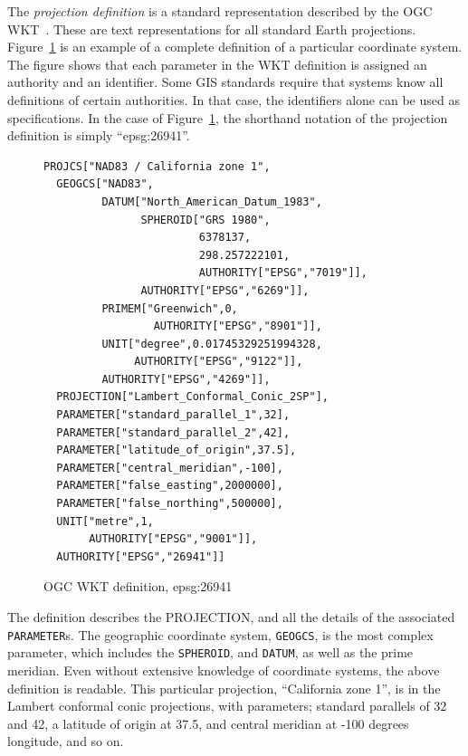 \documentclass{ucdthesis}       %
\begin{document}
The \emph{projection definition} is a standard representation
described by the \ac{OGC} \acf{WKT}~\cite{whites01defin-data}.  These
are text representations for all standard Earth projections.
Figure~\ref{fig:wkt} is an example of a complete definition of a
particular coordinate system.  The figure shows that each parameter in
the \ac{WKT} definition is assigned an authority and an identifier.
Some \ac{GIS} standards require that systems know all definitions of
certain authorities.  In that case, the identifiers alone can be used
as specifications.  In the case of Figure~\ref{fig:wkt}, the shorthand
notation of the projection definition is simply ``epsg:26941''.

\begin{figure}[htb]
  \centering
\begin{verbatim}
PROJCS["NAD83 / California zone 1",
  GEOGCS["NAD83",
         DATUM["North_American_Datum_1983",
               SPHEROID["GRS 1980",
                        6378137,
                        298.257222101,
                        AUTHORITY["EPSG","7019"]],
               AUTHORITY["EPSG","6269"]],
         PRIMEM["Greenwich",0,
                 AUTHORITY["EPSG","8901"]],
         UNIT["degree",0.01745329251994328,
              AUTHORITY["EPSG","9122"]],
         AUTHORITY["EPSG","4269"]],
  PROJECTION["Lambert_Conformal_Conic_2SP"],
  PARAMETER["standard_parallel_1",32],
  PARAMETER["standard_parallel_2",42],
  PARAMETER["latitude_of_origin",37.5],
  PARAMETER["central_meridian",-100],
  PARAMETER["false_easting",2000000],
  PARAMETER["false_northing",500000],
  UNIT["metre",1,
       AUTHORITY["EPSG","9001"]],
  AUTHORITY["EPSG","26941"]]
\end{verbatim}  
  \caption{\acs{OGC} \acs{WKT} definition, epsg:26941}
  \label{fig:wkt}
\end{figure}

The definition describes the PROJECTION, and all the details of the
associated \texttt{PARAMETER}s. The geographic coordinate system,
\texttt{GEOGCS}, is the most complex parameter, which includes the
\texttt{SPHEROID}, and \texttt{DATUM}, as well as the prime meridian.
Even without extensive knowledge of coordinate systems, the above
definition is readable.  This particular projection, ``California zone
1'', is in the Lambert conformal conic projections, with parameters;
standard parallels of 32 and 42, a latitude of origin at 37.5, and
central meridian at -100 degrees longitude, and so on.
\end{document}
